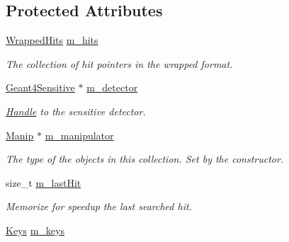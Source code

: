 \subsection*{Protected Attributes}
\begin{DoxyCompactItemize}
\item 
\hyperlink{class_d_d4hep_1_1_simulation_1_1_geant4_hit_collection_ada2cbec73b2d5005b514a33b44a1dc05}{WrappedHits} \hyperlink{class_d_d4hep_1_1_simulation_1_1_geant4_hit_collection_a8a2e237f209928a1598ccf0b72cd3d44}{m\_\-hits}
\begin{DoxyCompactList}\small\item\em The collection of hit pointers in the wrapped format. \item\end{DoxyCompactList}\item 
\hyperlink{class_d_d4hep_1_1_simulation_1_1_geant4_sensitive}{Geant4Sensitive} $\ast$ \hyperlink{class_d_d4hep_1_1_simulation_1_1_geant4_hit_collection_aaf3c4ccd370663a99af26333af3486e7}{m\_\-detector}
\begin{DoxyCompactList}\small\item\em \hyperlink{class_d_d4hep_1_1_handle}{Handle} to the sensitive detector. \item\end{DoxyCompactList}\item 
\hyperlink{class_d_d4hep_1_1_simulation_1_1_geant4_hit_wrapper_1_1_hit_manipulator}{Manip} $\ast$ \hyperlink{class_d_d4hep_1_1_simulation_1_1_geant4_hit_collection_ab65b438cada304dbfe15f9be6a329001}{m\_\-manipulator}
\begin{DoxyCompactList}\small\item\em The type of the objects in this collection. Set by the constructor. \item\end{DoxyCompactList}\item 
size\_\-t \hyperlink{class_d_d4hep_1_1_simulation_1_1_geant4_hit_collection_a67cef40b22ad50d9c6a5fdd620e1786f}{m\_\-lastHit}
\begin{DoxyCompactList}\small\item\em Memorize for speedup the last searched hit. \item\end{DoxyCompactList}\item 
\hyperlink{class_d_d4hep_1_1_simulation_1_1_geant4_hit_collection_a0d4d87fb90cf83dceff0b43928426135}{Keys} \hyperlink{class_d_d4hep_1_1_simulation_1_1_geant4_hit_collection_a3d45d2544cef7139ad425c2abc66c45a}{m\_\-keys}

\end{DoxyCompactItemize}
